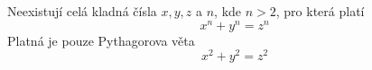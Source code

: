 Neexistují celá kladná čísla $x, y, z$ a $n$,
kde $n > 2$, pro která platí
\begin{equation}
x^n + y^n = z^n
\end{equation}
Platná je pouze Pythagorova věta
$$x^2 + y^2 = z^2$$